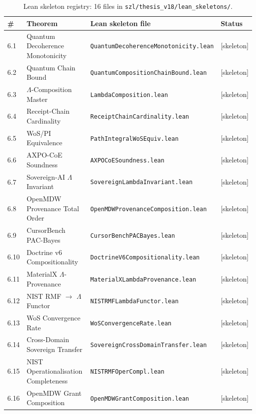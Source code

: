 \begin{table}[ht]
\centering
\small
\begin{tabular}{llll}
\hline
\# & Theorem & Lean skeleton file & Status \\
\hline
6.1  & Quantum Decoherence Monotonicity
     & \texttt{QuantumDecoherenceMonotonicity.lean} & [skeleton] \\
6.2  & Quantum Chain Bound
     & \texttt{QuantumCompositionChainBound.lean} & [skeleton] \\
6.3  & $\Lambda$-Composition Master
     & \texttt{LambdaComposition.lean} & [skeleton] \\
6.4  & Receipt-Chain Cardinality
     & \texttt{ReceiptChainCardinality.lean} & [skeleton] \\
6.5  & WoS/PI Equivalence
     & \texttt{PathIntegralWoSEquiv.lean} & [skeleton] \\
6.6  & AXPO-CoE Soundness
     & \texttt{AXPOCoESoundness.lean} & [skeleton] \\
6.7  & Sovereign-AI $\Lambda$ Invariant
     & \texttt{SovereignLambdaInvariant.lean} & [skeleton] \\
6.8  & OpenMDW Provenance Total Order
     & \texttt{OpenMDWProvenanceComposition.lean} & [skeleton] \\
6.9  & CursorBench PAC-Bayes
     & \texttt{CursorBenchPACBayes.lean} & [skeleton] \\
6.10 & Doctrine v6 Compositionality
     & \texttt{DoctrineV6Compositionality.lean} & [skeleton] \\
6.11 & MaterialX $\Lambda$-Provenance
     & \texttt{MaterialXLambdaProvenance.lean} & [skeleton] \\
6.12 & NIST RMF $\to$ $\Lambda$ Functor
     & \texttt{NISTRMFLambdaFunctor.lean} & [skeleton] \\
6.13 & WoS Convergence Rate
     & \texttt{WoSConvergenceRate.lean} & [skeleton] \\
6.14 & Cross-Domain Sovereign Transfer
     & \texttt{SovereignCrossDomainTransfer.lean} & [skeleton] \\
6.15 & NIST Operationalisation Completeness
     & \texttt{NISTRMFOperCompl.lean} & [skeleton] \\
6.16 & OpenMDW Grant Composition
     & \texttt{OpenMDWGrantComposition.lean} & [skeleton] \\
\hline
\end{tabular}
\caption{Lean skeleton registry: 16 files in
\texttt{szl/thesis\_v18/lean\_skeletons/}.}
\label{tab:lean-skeletons}
\end{table}

